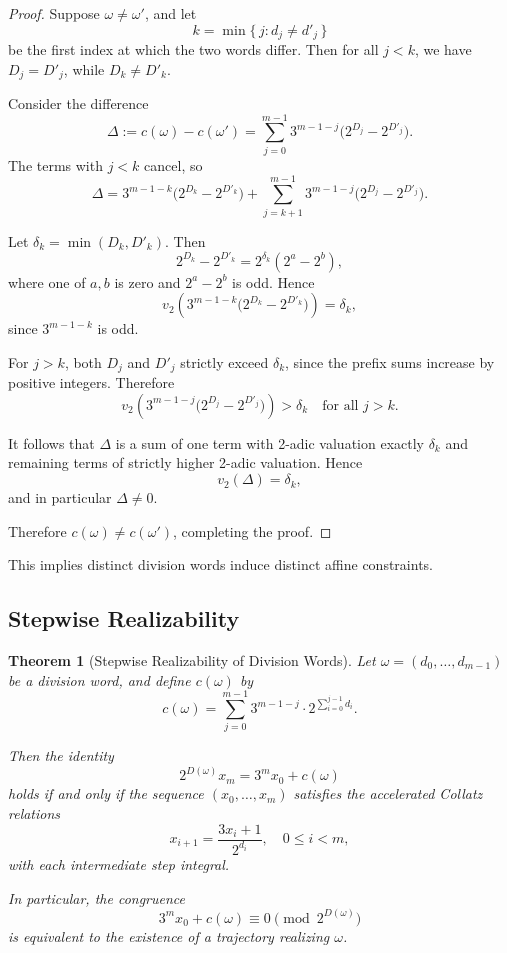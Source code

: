 \documentclass[12pt, oneside]{article}
\numberwithin{equation}{section}
\theoremstyle{definition}
\theoremstyle{plain}
\newtheorem{theorem}{Theorem}[section]
\theoremstyle{remark}
\begin{document}
\begin{proof}
Suppose $\omega \ne \omega'$, and let
\[
k = \min\{\, j : d_j \ne d'_j \,\}
\]
be the first index at which the two words differ. Then for all $j < k$,
we have $D_j = D'_j$, while $D_k \ne D'_k$.

Consider the difference
\[
\Delta := c(\omega) - c(\omega')
=
\sum_{j=0}^{m-1}
3^{m-1-j}\bigl(2^{D_j} - 2^{D'_j}\bigr).
\]
The terms with $j<k$ cancel, so
\[
\Delta
=
3^{m-1-k}\bigl(2^{D_k} - 2^{D'_k}\bigr)
+
\sum_{j=k+1}^{m-1}
3^{m-1-j}\bigl(2^{D_j} - 2^{D'_j}\bigr).
\]

Let $\delta_k = \min(D_k, D'_k)$. Then
\[
2^{D_k} - 2^{D'_k}
=
2^{\delta_k}(2^a - 2^b),
\]
where one of $a,b$ is zero and $2^a - 2^b$ is odd. Hence
\[
v_2\!\left(3^{m-1-k}\bigl(2^{D_k} - 2^{D'_k}\bigr)\right)
=
\delta_k,
\]
since $3^{m-1-k}$ is odd.

For $j>k$, both $D_j$ and $D'_j$ strictly exceed $\delta_k$, since the
prefix sums increase by positive integers. Therefore
\[
v_2\!\left(3^{m-1-j}\bigl(2^{D_j} - 2^{D'_j}\bigr)\right)
>
\delta_k
\quad \text{for all } j>k.
\]

It follows that $\Delta$ is a sum of one term with 2-adic valuation
exactly $\delta_k$ and remaining terms of strictly higher 2-adic
valuation. Hence
\[
v_2(\Delta) = \delta_k,
\]
and in particular $\Delta \ne 0$.

Therefore $c(\omega) \ne c(\omega')$, completing the proof.
\end{proof}

This implies distinct division words induce distinct affine constraints.

\subsection{Stepwise Realizability}

\begin{theorem}[Stepwise Realizability of Division Words]
\label{thm:stepwise-realizability}
Let $\omega = (d_0,\dots,d_{m-1})$ be a division word, and define $c(\omega)$ by
\[
c(\omega)
=
\sum_{j=0}^{m-1}
3^{m-1-j}\cdot 2^{\sum_{i=0}^{j-1} d_i}.
\]

Then the identity
\[
2^{D(\omega)} x_m = 3^m x_0 + c(\omega)
\]
holds if and only if the sequence $(x_0,\dots,x_m)$ satisfies the accelerated
Collatz relations
\[
x_{i+1} = \frac{3x_i+1}{2^{d_i}}, \quad 0 \le i < m,
\]
with each intermediate step integral.

In particular, the congruence
\[
3^m x_0 + c(\omega) \equiv 0 \pmod{2^{D(\omega)}}
\]
is equivalent to the existence of a trajectory realizing $\omega$.
\end{theorem}
\end{document}
